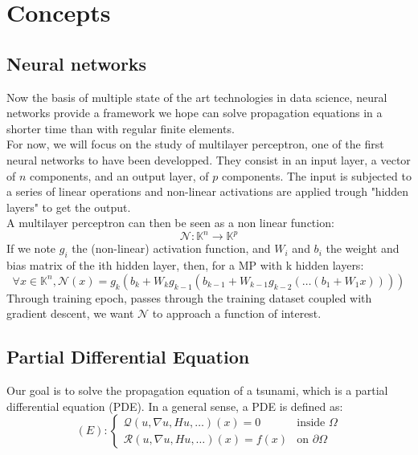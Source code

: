 \chapter{Concepts}\label{ch:2}
\section{Neural networks}
Now the basis of multiple state of the art technologies in data science, neural networks provide a framework we hope can solve propagation equations in a shorter time than with regular finite elements.\\
For now, we will focus on the study of multilayer perceptron, one of the first neural networks to have been developped. They consist in an input layer, a vector of $n$ components, and an output layer, of $p$ components.
The input is subjected to a series of linear operations and non-linear activations are applied trough "hidden layers" to get the output.\\
A multilayer perceptron can then be seen as a non linear function:
    $$\mathcal{N} : \mathbb{K}^n \rightarrow \mathbb{K}^p$$
\newline
If we note $g_i$ the (non-linear) activation function, and $W_i$ and $b_i$ the weight and bias matrix of the ith hidden layer, then, for a MP with k hidden layers:
\begin{equation}
     \forall x \in \mathbb{K}^n, \mathcal{N}(x) = g_k(b_k + W_k g_{k-1}(b_{k-1}+W_{k-1} g_{k-2}(\dots(b_1 + W_1 x))))
\end{equation}
Through training epoch, passes through the training dataset coupled with gradient descent, we want $\mathcal{N}$ to approach a function of interest.

\section{Partial Differential Equation}
Our goal is to solve the propagation equation of a tsunami, which is a partial differential equation (PDE). In a general sense, a PDE is defined as:
\begin{equation*}
    (E): 
    \begin{cases}
        \mathcal{Q}(u, \nabla u, H u, \dots)(x) = 0 & \text{inside $\Omega$}\\
        \mathcal{R}(u, \nabla u, H u, \dots)(x) = f(x) & \text{on $\partial \Omega$}
    \end{cases}
\end{equation*}


